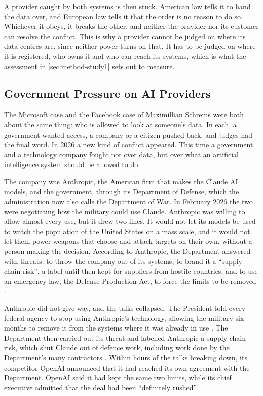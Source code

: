 A provider caught by both systems is then stuck. American law tells it to hand the
data over, and European law tells it that the order is no reason to do so. Whichever
it obeys, it breaks the other, and neither the provider nor its customer can
resolve the conflict. This is why a provider cannot be judged on where its data
centres are, since neither power turns on that. It has to be judged on where it is
registered, who owns it and who can reach its systems, which is what the assessment
in \cref{sec:method-study1} sets out to measure.

\subsection{Government Pressure on AI Providers}
\label{subsec:ai-providers}

The Microsoft case and the Facebook case of Maximillian Schrems were both about the
same thing: who is allowed to look at someone's data. In each, a government wanted
access, a company or a citizen pushed back, and judges had the final word. In 2026
a new kind of conflict appeared. This time a government and a technology company
fought not over data, but over what an artificial intelligence system should be
allowed to do.

The company was Anthropic, the American firm that makes the Claude \acs{AI}
models, and the government, through its Department of
Defense, which the administration now also calls the Department of War. In
February 2026 the two were negotiating how the military could use Claude. Anthropic
was willing to allow almost every use, but it drew two lines. It would not let its
models be used to watch the population of the United States on a mass scale, and it
would not let them power weapons that choose and attack targets on their own,
without a person making the decision. According to Anthropic, the Department
answered with threats: to throw the company out of its systems, to brand it a
\enquote{supply chain risk}, a label until then kept for suppliers from hostile
countries, and to use an emergency law, the Defense Production Act, to force the
limits to be removed \cite{Anthropic_DoW_Statement_2026}.

Anthropic did not give way, and the talks collapsed. The President told every
federal agency to stop using Anthropic's technology, allowing the military six
months to remove it from the systems where it was already in use
\cite{AlJazeera_OpenAI_Pentagon_2026}. The Department then carried out its threat
and labelled Anthropic a supply chain risk, which shut Claude out of defence work,
including work done by the Department's many contractors
\cite{AP_Anthropic_DCCircuit_2026}. Within hours of the talks breaking down, its
competitor OpenAI announced that it had reached its own agreement with the
Department. OpenAI said it had kept the same two limits, while its chief executive
admitted that the deal had been \enquote{definitely rushed}
\cite{AlJazeera_OpenAI_Pentagon_2026,TechCrunch_OpenAI_Pentagon_2026}.

